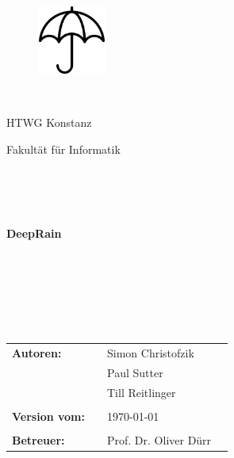 \thispagestyle{empty}


\begin{figure}[t]
 \centering
 \includegraphics[width=0.2\textwidth]{abb/regenschirm}
\end{figure}


\begin{verbatim}


\end{verbatim}

\begin{center}
\Large{HTWG Konstanz}\\
\end{center}

\begin{center}
\Large{Fakultät für Informatik}
\end{center}
\begin{verbatim}




\end{verbatim}
\begin{center}
\textbf{\LARGE{DeepRain}} \\
\vspace{1cm}
\doublespacing
\textbf{\LARGE{\titleDocument}}\\
\singlespacing
\begin{verbatim}

\end{verbatim}
\textbf{{~\subjectDocument}}
\end{center}
\begin{verbatim}

\end{verbatim}
\begin{center}

\end{center}
\begin{verbatim}


\end{verbatim}
\begin{flushleft}
\begin{tabular}{llll}
\textbf{Autoren:} & & Simon Christofzik& \\
& & Paul Sutter& \\
& & Till Reitlinger \\
& & \\
\textbf{Version vom:} & & \today &\\
& & \\
\textbf{Betreuer:} & & Prof. Dr. Oliver Dürr &\\
\end{tabular}
\end{flushleft}
